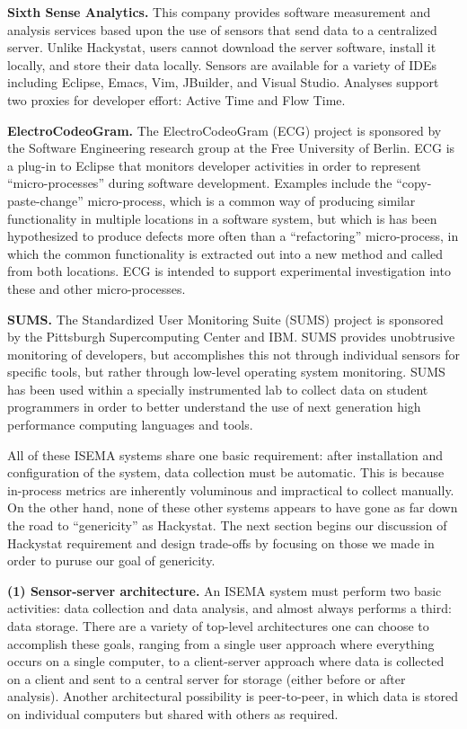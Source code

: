 \documentclass[10pt,twocolumn]{article}
\begin{document}
{\bf Sixth Sense Analytics.} This company \cite{SixthSenseAnalytics}
provides software measurement and analysis services based upon the use of
sensors that send data to a centralized server.  Unlike Hackystat, users
cannot download the server software, install it locally, and store their
data locally. Sensors are available for a variety of IDEs including
Eclipse, Emacs, Vim, JBuilder, and Visual Studio. Analyses support two
proxies for developer effort: Active Time and Flow Time. 

{\bf ElectroCodeoGram.}  The ElectroCodeoGram (ECG) project \cite{ECG} is
sponsored by the Software Engineering research group at the Free University
of Berlin. ECG is a plug-in to Eclipse that monitors developer activities
in order to represent ``micro-processes'' during software development.
Examples include the ``copy-paste-change'' micro-process, which is a common
way of producing similar functionality in multiple locations in a software
system, but which is has been hypothesized to produce defects more often
than a ``refactoring'' micro-process, in which the common functionality is
extracted out into a new method and called from both locations.  ECG is
intended to support experimental investigation into these and other
micro-processes.

 {\bf SUMS.} The Standardized User Monitoring Suite (SUMS) project
\cite{SUMS} is sponsored by the Pittsburgh Supercomputing Center and IBM.
SUMS provides unobtrusive monitoring of developers, but accomplishes this
not through individual sensors for specific tools, but rather through
low-level operating system monitoring.  SUMS has been used within a
specially instrumented lab to collect data on student programmers in order
to better understand the use of next generation high performance computing
languages and tools.

All of these ISEMA systems share one basic requirement: after installation
and configuration of the system, data collection must be automatic. This is
because in-process metrics are inherently voluminous and impractical to
collect manually.  On the other hand, none of these other systems appears
to have gone as far down the road to ``genericity'' as Hackystat.  The next
section begins our discussion of Hackystat requirement and 
design trade-offs by focusing on those we made in order to puruse our 
goal of genericity.


{\bf (1) Sensor-server architecture.} An ISEMA system must perform two basic
activities: data collection and data analysis, and almost always performs
a third: data storage.  There are a variety of top-level architectures one
can choose to accomplish these goals, ranging from a single user approach where
everything occurs on a single computer, to a client-server approach where data
is collected on a client and sent to a central server for storage (either before
or after analysis).  Another architectural possibility is peer-to-peer, in which 
data is stored on individual computers but shared with others as required. 
\end{document}
